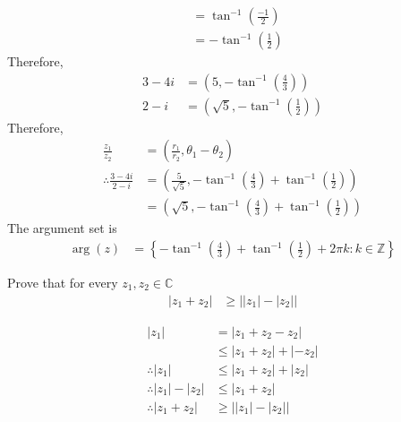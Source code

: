 \documentclass[fleqn, a4paper, 11pt, oneside]{amsart}
\theoremstyle{definition}
\theoremstyle{theorem}
\begin{document}
\begin{solution}
\begin{enumerate}[leftmargin=*]
\begin{align*}
                                         & = \tan^{-1}\left( \frac{-1}{2} \right)    \\
                                         & = -\tan^{-1}\left( \frac{1}{2} \right)
			\end{align*}
			Therefore,
			\begin{align*}
				3 - 4 i & = \left( 5 , -\tan^{-1}\left( \frac{4}{3} \right) \right) \\
				2 - i   & = \left( \sqrt{5} , -\tan^{-1}\left( \frac{1}{2} \right) \right)
			\end{align*}
			Therefore,
			\begin{align*}
				\frac{z_1}{z_2}                  & = \left( \frac{r_1}{r_2} , \theta_1 - \theta_2 \right)                                                           \\
				\therefore \frac{3 - 4 i}{2 - i} & = \left( \frac{5}{\sqrt{5}} , -\tan^{-1}\left( \frac{4}{3} \right) + \tan^{-1}\left( \frac{1}{2} \right) \right) \\
                                                                 & = \left( \sqrt{5} , -\tan^{-1}\left( \frac{4}{3} \right) + \tan^{-1}\left( \frac{1}{2} \right) \right)
			\end{align*}
			The argument set is
			\begin{align*}
				\arg(z) & = \left\{ -\tan^{-1}\left( \frac{4}{3} \right) + \tan^{-1}\left( \frac{1}{2} \right) + 2 \pi k : k \in \mathbb{Z} \right\}
			\end{align*}
	\end{enumerate}
\end{solution}

\setcounter{question}{7}
\begin{question}
	Prove that for every $z_1,z_2 \in \mathbb{C}$
	\begin{align*}
		|z_1 + z_2| & \ge \left| |z_1| - |z_2| \right|
	\end{align*}
\end{question}

\begin{solution}
	\begin{align*}
		|z_1|                    & = |z_1 + z_2 - z_2|      \\
                                         & \le |z_1 + z_2| + |-z_2| \\
		\therefore |z_1|         & \le |z_1 + z_2| + |z_2|  \\
		\therefore |z_1| - |z_2| & \le |z_1 + z_2|          \\
		\therefore |z_1 + z_2|   & \ge \left| |z_1| - |z_2| \right|
	\end{align*}
\end{solution}
\end{document}
